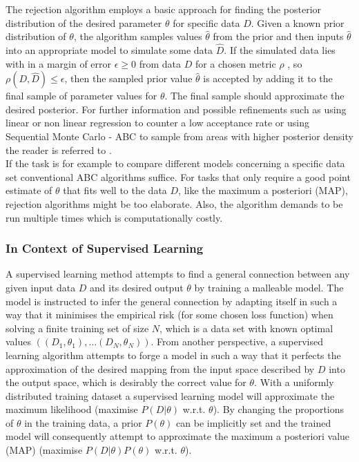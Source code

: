 \documentclass[a4paper, 11pt]{article}
\begin{document}
The rejection algorithm employs a basic approach for finding the posterior distribution of the desired parameter $\theta$ for specific data $D$. Given a known prior distribution of $\theta$, the algorithm samples values $\hat{\theta}$ from the prior and then inputs $\hat{\theta}$ into an appropriate model to simulate some data $\hat{D}$. If the simulated data lies with in a margin of error $\epsilon \geq 0$ from data $D$ for a chosen metric $\rho$ , so $\rho(D, \hat{D}) \leq \epsilon$, then the sampled prior value $\hat{\theta}$ is accepted by adding it to the final sample of parameter values for $\theta$. The final sample should approximate the desired posterior. For further information and possible refinements such as using linear or non linear regression to counter a low acceptance rate or using Sequential Monte Carlo - ABC to sample from areas with higher posterior density the reader is referred to \cite{csillery2010approximate}. \\
If the task is for example to compare different models concerning a specific data set conventional ABC algorithms suffice. For tasks that only require a good point estimate of $\theta$ that fits well to the data $D$, like the maximum a posteriori (MAP), rejection algorithms might be too elaborate. Also, the algorithm demands to be run multiple times which is computationally costly.\\

\subsubsection{In Context of Supervised Learning}

A supervised learning method attempts to find a general connection between any given input data $D$ and its desired output $\theta$ by training a malleable model. The model is instructed to infer the general connection by adapting itself in such a way that it minimises the empirical risk (for some chosen loss function) when solving a finite training set of size $N$, which is a data set with known optimal values $((D_1,\theta_1),\ldots (D_N,\theta_N))$. From another perspective, a supervised learning algorithm attempts to forge a model in such a way that it perfects the approximation of the desired mapping from the input space described by $D$ into the output space, which is desirably the correct value for $\theta$. With a uniformly distributed training dataset a supervised learning model will approximate the maximum likelihood (maximise $P(D|\theta)$ w.r.t. $\theta$). By changing the proportions of $\theta$ in the training data, a prior $P(\theta)$ can be implicitly set and the trained model will consequently attempt to approximate the maximum a posteriori value (MAP) (maximise $P(D|\theta)P(\theta)$ w.r.t. $\theta$).\\
\end{document}
